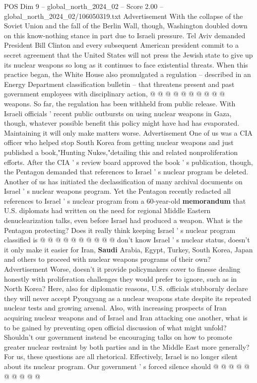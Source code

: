 \begin{textsample}{POS Dim 9 – global\_north\_2024\_02 – Score 2.00 – global\_north\_2024\_02/106050319.txt}
Advertisement With the collapse of the Soviet Union and the fall of the Berlin Wall, though, Washington doubled down on this know-nothing stance in part due to Israeli pressure.
Tel Aviv demanded President Bill Clinton and every subsequent American president commit to a secret agreement that the United States will not press the Jewish state to give up its nuclear weapons so long as it continues to face existential threats.
When this practice began, the White House also promulgated a regulation -- described in an Energy Department classification bulletin -- that threatens present and past government employees with disciplinary action, @ @ @ @ @ @ @ @ @ @ weapons.
So far, the regulation has been withheld from public release.
With Israeli officials ' recent public outbursts on using nuclear weapons in Gaza, though, whatever possible benefit this policy might have had has evaporated.
Maintaining it will only make matters worse.
Advertisement One of us was a CIA officer who helped stop South Korea from getting nuclear weapons and just published a book,"Hunting Nukes,"detailing this and related nonproliferation efforts.
After the CIA ' s review board approved the book ' s publication, though, the Pentagon demanded that references to Israel ' s nuclear program be deleted.
Another of us has initiated the declassification of many archival documents on Israel ' s nuclear weapons program.
Yet the Pentagon recently redacted all references to Israel ' s nuclear program from a 60-year-old \textbf{memorandum} that U.S. diplomats had written on the need for regional Middle Eastern denuclearization talks, even before Israel had produced a weapon.
What is the Pentagon protecting?
Does it really think keeping Israel ' s nuclear program classified is @ @ @ @ @ @ @ @ @ @ don't know Israel ' s nuclear status, doesn't it only make it easier for Iran, \textbf{Saudi} Arabia, Egypt, Turkey, South Korea, Japan and others to proceed with nuclear weapons programs of their own?
Advertisement Worse, doesn't it provide policymakers cover to finesse dealing honestly with proliferation challenges they would prefer to ignore, such as in North Korea?
Here, also for diplomatic reasons, U.S. officials stubbornly declare they will never accept Pyongyang as a nuclear weapons state despite its repeated nuclear tests and growing arsenal.
Also, with increasing prospects of Iran acquiring nuclear weapons and of Israel and Iran attacking one another, what is to be gained by preventing open official discussion of what might unfold?
Shouldn't our government instead be encouraging talks on how to promote greater nuclear restraint by both parties and in the Middle East more generally?
For us, these questions are all rhetorical.
Effectively, Israel is no longer silent about its nuclear program.
Our government ' s forced silence should @ @ @ @ @ @ @ @ @ @

\end{textsample}
